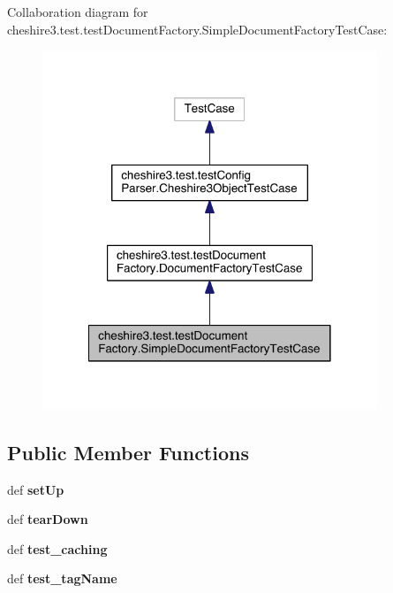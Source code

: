 Collaboration diagram for cheshire3.\-test.\-test\-Document\-Factory.\-Simple\-Document\-Factory\-Test\-Case\-:
\nopagebreak
\begin{figure}[H]
\begin{center}
\leavevmode
\includegraphics[width=284pt]{classcheshire3_1_1test_1_1test_document_factory_1_1_simple_document_factory_test_case__coll__graph}
\end{center}
\end{figure}
\subsection*{Public Member Functions}
\begin{DoxyCompactItemize}
\item 
\hypertarget{classcheshire3_1_1test_1_1test_document_factory_1_1_simple_document_factory_test_case_aa2019663dae5bc9d4a649393702ea0da}{def {\bfseries set\-Up}}\label{classcheshire3_1_1test_1_1test_document_factory_1_1_simple_document_factory_test_case_aa2019663dae5bc9d4a649393702ea0da}

\item 
\hypertarget{classcheshire3_1_1test_1_1test_document_factory_1_1_simple_document_factory_test_case_ad4757ba8c6cb88d3471932554dec732a}{def {\bfseries tear\-Down}}\label{classcheshire3_1_1test_1_1test_document_factory_1_1_simple_document_factory_test_case_ad4757ba8c6cb88d3471932554dec732a}

\item 
\hypertarget{classcheshire3_1_1test_1_1test_document_factory_1_1_simple_document_factory_test_case_a9d11053d1738362928eb61a9b84e472f}{def {\bfseries test\-\_\-caching}}\label{classcheshire3_1_1test_1_1test_document_factory_1_1_simple_document_factory_test_case_a9d11053d1738362928eb61a9b84e472f}

\item 
\hypertarget{classcheshire3_1_1test_1_1test_document_factory_1_1_simple_document_factory_test_case_aa29b474dfa726a68285e9ad51040adf8}{def {\bfseries test\-\_\-tag\-Name}}\label{classcheshire3_1_1test_1_1test_document_factory_1_1_simple_document_factory_test_case_aa29b474dfa726a68285e9ad51040adf8}

\end{DoxyCompactItemize}
